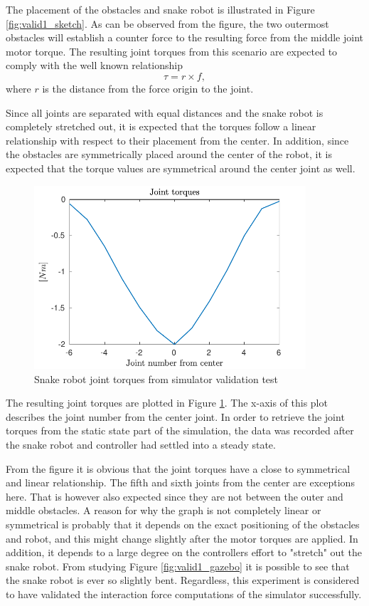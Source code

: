 The placement of the obstacles and snake robot is illustrated in Figure \ref{fig:valid1_sketch}. As can be observed from the figure, the two outermost obstacles will establish a counter force to the resulting force from the middle joint motor torque. The resulting joint torques from this scenario are expected to comply with the well known relationship
\begin{equation}
    \tau = r\times f,
\end{equation}
where $r$ is the distance from the force origin to the joint.

Since all joints are separated with equal distances and the snake robot is completely stretched out, it is expected that the torques follow a linear relationship with respect to their placement from the center. In addition, since the obstacles are symmetrically placed around the center of the robot, it is expected that the torque values are symmetrical around the center joint as well.

\begin{figure}[h!]
    \centering
    \includegraphics[width=0.9\textwidth]{figures/experiments/validation1.pdf}
    \caption{Snake robot joint torques from simulator validation test}
    \label{fig:validation1}
\end{figure}

The resulting joint torques are plotted in Figure \ref{fig:validation1}. The x-axis of this plot describes the joint number from the center joint. In order to retrieve the joint torques from the static state part of the simulation, the data was recorded after the snake robot and controller had settled into a steady state.

From the figure it is obvious that the joint torques have a close to symmetrical and linear relationship. The fifth and sixth joints from the center are exceptions here. That is however also expected since they are not between the outer and middle obstacles. A reason for why the graph is not completely linear or symmetrical is probably that it depends on the exact positioning of the obstacles and robot, and this might change slightly after the motor torques are applied. In addition, it depends to a large degree on the controllers effort to "stretch" out the snake robot. From studying Figure \ref{fig:valid1_gazebo} it is possible to see that the snake robot is ever so slightly bent.
Regardless, this experiment is considered to have validated the interaction force computations of the simulator successfully. 

